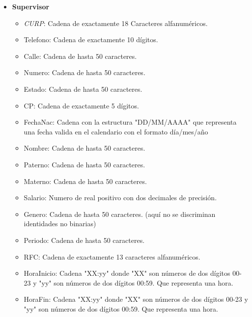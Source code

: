\documentclass{exam}
\begin{document}
\begin{itemize}
	\item \textbf{Supervisor}
		\begin{itemize}
			\item \textit{CURP}: Cadena de exactamente 18 Caracteres alfanuméricos.
			\item Telefono: Cadena de exactamente 10 dígitos.
			\item Calle: Cadena de hasta 50 caracteres.
			\item Numero: Cadena de hasta 50 caracteres.
			\item Estado: Cadena de hasta 50 caracteres.
			\item CP: Cadena de exactamente 5 dígitos.
			\item FechaNac: Cadena con la estructura "DD/MM/AAAA" que representa una fecha valida en el calendario con el formato día/mes/año
			\item Nombre: Cadena de hasta 50 caracteres.
			\item Paterno: Cadena de hasta 50 caracteres.
			\item Materno: Cadena de hasta 50 caracteres.
			\item Salario: Numero de real positivo con dos decimales de precisión.
			\item Genero: Cadena de hasta 50 caracteres. (aquí no se discriminan identidades no binarias)
			\item Periodo: Cadena de hasta 50 caracteres.
			\item RFC: Cadena de exactamente 13 caracteres alfanuméricos.
			\item HoraInicio: Cadena "XX:yy" donde "XX" son números de dos dígitos 00-23 y "yy" son números de dos dígitos 00:59. Que representa una hora.
			\item HoraFin: Cadena "XX:yy" donde "XX" son números de dos dígitos 00-23 y "yy" son números de dos dígitos 00:59. Que representa una hora. 
		\end{itemize}
		

\end{itemize}
\end{document}
